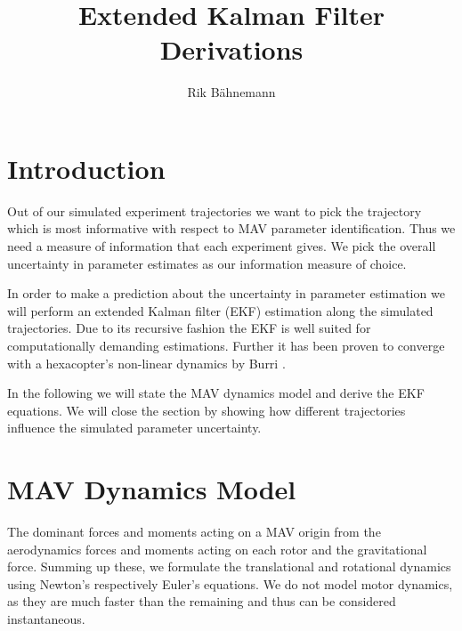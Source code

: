 \documentclass[10pt,a4paper]{article}
\title{Extended Kalman Filter Derivations}
\author{Rik Bähnemann}
\begin{document}
\maketitle
\section{Introduction}
Out of our simulated experiment trajectories we want to pick the trajectory which is most informative with respect to MAV parameter identification. Thus we need a measure of information that each experiment gives. We pick the overall uncertainty in parameter estimates as our information measure of choice. 

In order to make a prediction about the uncertainty in parameter estimation we will perform an extended Kalman filter (EKF) estimation along the simulated trajectories. Due to its recursive fashion the EKF is well suited for computationally demanding estimations. Further it has been proven to converge with a hexacopter's non-linear dynamics by Burri \cite{burri2015robust}.

In the following we will state the MAV dynamics model and derive the EKF equations. We will close the section by showing how different trajectories influence the simulated parameter uncertainty.

\section{MAV Dynamics Model}
The dominant forces and moments acting on a MAV origin from the aerodynamics forces and moments acting on each rotor and the gravitational force. Summing up these, we formulate the translational and rotational dynamics using Newton's respectively Euler's equations. We do not model motor dynamics, as they are much faster than the remaining and thus can be considered instantaneous.
\end{document}
